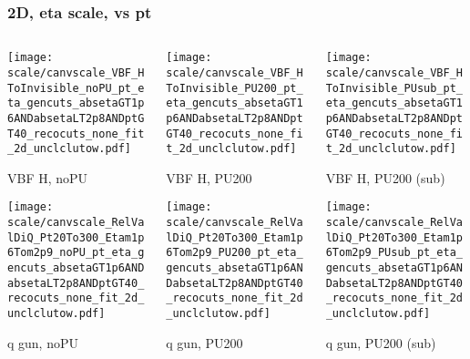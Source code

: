 \documentclass[8pt]{beamer}
\begin{document}
   \begin{frame}
  \frametitle{2D, eta scale, vs pt}
  
  \begin{columns}
   \begin{column}{0.35\textwidth}
     \texttt{[image: scale/canvscale\_VBF\_HToInvisible\_noPU\_pt\_eta\_gencuts\_absetaGT1p6ANDabsetaLT2p8ANDptGT40\_recocuts\_none\_fit\_2d\_unclclutow.pdf]}
     
     VBF H, noPU
    
     \texttt{[image: scale/canvscale\_RelValDiQ\_Pt20To300\_Etam1p6Tom2p9\_noPU\_pt\_eta\_gencuts\_absetaGT1p6ANDabsetaLT2p8ANDptGT40\_recocuts\_none\_fit\_2d\_unclclutow.pdf]}
     
     q gun, noPU
   \end{column}
   \begin{column}{0.35\textwidth}
     \texttt{[image: scale/canvscale\_VBF\_HToInvisible\_PU200\_pt\_eta\_gencuts\_absetaGT1p6ANDabsetaLT2p8ANDptGT40\_recocuts\_none\_fit\_2d\_unclclutow.pdf]}
     
     VBF H, PU200
    
     \texttt{[image: scale/canvscale\_RelValDiQ\_Pt20To300\_Etam1p6Tom2p9\_PU200\_pt\_eta\_gencuts\_absetaGT1p6ANDabsetaLT2p8ANDptGT40\_recocuts\_none\_fit\_2d\_unclclutow.pdf]}
     
     q gun, PU200
   \end{column}
   \begin{column}{0.35\textwidth}
     \texttt{[image: scale/canvscale\_VBF\_HToInvisible\_PUsub\_pt\_eta\_gencuts\_absetaGT1p6ANDabsetaLT2p8ANDptGT40\_recocuts\_none\_fit\_2d\_unclclutow.pdf]}
     
     VBF H, PU200 (sub)
    
     \texttt{[image: scale/canvscale\_RelValDiQ\_Pt20To300\_Etam1p6Tom2p9\_PUsub\_pt\_eta\_gencuts\_absetaGT1p6ANDabsetaLT2p8ANDptGT40\_recocuts\_none\_fit\_2d\_unclclutow.pdf]}
     
     q gun, PU200 (sub)
   \end{column}
  \end{columns}
 \end{frame}
 
\end{document}
